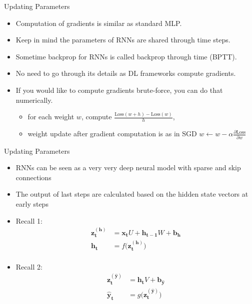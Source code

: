 \documentclass[12pt]{beamer}
\begin{document}
\begin{frame}{Updating Parameters}
	\begin{itemize}
		\item Computation of gradients is similar as standard MLP.
		\item Keep in mind the parameters of RNNs are shared through time steps. 
		\item Sometime backprop for RNNs is called backprop through time (BPTT). 
		\item No need to go through its details as DL frameworks compute gradients. 
		\item If you would like to compute gradients brute-force, you can do that numerically. 
		\begin{itemize}
			\item for each weight $w$, compute $\frac{\text{Loss}(w+h) - \text{Loss}(w)}{h}$, 
			\item weight update after gradient computation is as in SGD $w \longleftarrow w - \alpha \frac{\partial \text{Loss}}{\partial w}$
		\end{itemize}
	\end{itemize}
\end{frame}

\begin{frame}{Updating Parameters}
	\begin{itemize}
		\item RNNs can be seen as a very very deep neural model with sparse and skip connections
		\item The output of last steps are calculated based on the hidden state vectors at early steps
		\item Recall 1:
		\begin{equation*}
		\begin{split}
		\bm{z^{(h)}_t} & = \bm{x_t}U + \bm{h_{t-1}}W + \bm{b_h} \\
		\bm{h_t} & =  f \big( \bm{z^{(h)}_t} \big) \\
		\end{split}
		\end{equation*}
		\item Recall 2:
		\begin{equation*}
		\begin{split}
		\bm{z^{(\hat{y})}_t} & = \bm{h_t}V + \bm{b_{\hat{y}}}  \\ 
		\bm{\hat{y}_t} & =  g \big(  \bm{z^{(\hat{y})}_t} \big) 
		\end{split}
		\end{equation*}
		
	\end{itemize}    
\end{frame}
\end{document}
